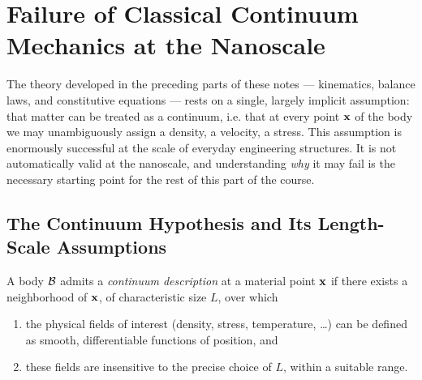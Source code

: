 \chapter{Failure of Classical Continuum Mechanics at the Nanoscale}\label{failureCM}

The theory developed in the preceding parts of these notes --- kinematics, balance laws, and constitutive equations --- rests on a single, largely implicit assumption: that matter can be treated as a continuum, i.e. that at every point $\mathbf{x}$ of the body we may unambiguously assign a density, a velocity, a stress. This assumption is enormously successful at the scale of everyday engineering structures. It is not automatically valid at the nanoscale, and understanding \textit{why} it may fail is the necessary starting point for the rest of this part of the course.

\section{The Continuum Hypothesis and Its Length-Scale Assumptions}

\begin{definition}
	A body $\mathcal{B}$ admits a \textit{continuum description} at a material point $\mathbf{x}$ if there exists a neighborhood of $\mathbf{x}$, of characteristic size $L$, over which
	\begin{enumerate}
		\item the physical fields of interest (density, stress, temperature, \ldots) can be defined as smooth, differentiable functions of position, and
		\item these fields are insensitive to the precise choice of $L$, within a suitable range.
	\end{enumerate}
\end{definition}

